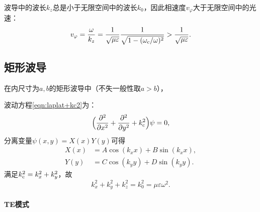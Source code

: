 波导中的波长$k_z$总是小于无限空间中的波长$k_0$，因此相速度$v_\varphi$大于无限空间中的光速：
\[
    v_\varphi=\frac\omega{k_z}=\frac1{\sqrt{\mu\varepsilon}}\frac1{\sqrt{1-(\omega\c/\omega)^2}}>\frac1{\sqrt{\mu\varepsilon}}.
\]
\subsection{矩形波导}
\label{ssec:rectangular waveguide}
在内尺寸为$a,b$的矩形波导中（不失一般性取$a>b$），
\begin{center}
    \label{fig:rectangle waveguide}
\end{center}
波动方程\eqref{eqn:laplat+kc2}为：
\begin{equation}
    \Bigkh{\pp[2]x+\pp[2]y+k\c^2}\psi=0,
\end{equation}
分离变量$\psi(x,y)=X(x)Y(y)$可得
\begin{align*}
    X(x)&=A\cos(k_xx)+B\sin(k_xx),\\
    Y(y)&=C\cos(k_yy)+D\sin(k_yy).
\end{align*}
满足$k\c^2=k_x^2+k_y^2$，故
\begin{equation}
    k_x^2+k_y^2+k_z^2=k_0^2=\mu\varepsilon\omega^2.
\end{equation}

\paragraph{TE模式}

